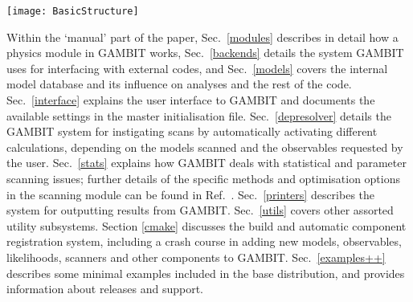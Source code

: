 \documentclass[pdftex,twocolumn,epjc3_preprint,runningheads]{svjour3}
\renewcommand{\_}{\discretionary{\underscore}{}{\underscore}}
\newcommand{\gambit}{\textsf{GAMBIT}\xspace}
\newcommand{\scannerbit}{\textsf{ScannerBit}\xspace}
\newcommand{\GB}{\gambit}
\newcommand\YAML{\textsf{YAML}\xspace}
\begin{document}
\begin{figure*}[t]
\centering
\texttt{[image: BasicStructure]}
\caption[A schematic representation of the basic elements of a \GB scan]{A schematic representation of the basic elements of a \GB scan.  The user provides a \YAML input file (see \href{http://www.yaml.org/}{www.yaml.org}), which chooses a model to scan and some observables or likelihoods to calculate.  The requested model $\delta$ and its ancestor models (see text for definition) $\beta$ and $\alpha$ are activated.  All model-dependent module and backend functions/variables are tested for compatibility with the activated models; incompatible functions are disabled (C2 in the example).  Module functions are identified that can provide the requested quantities (A2 and B1 in the example), and other module functions are identified to fulfil their dependencies.  More are identified to fulfil those functions' dependencies until all dependencies are filled.  Backend functions and variables are found that can fulfil the backend requirements of all chosen module functions.  The \textsf{Core} determines the correct module function evaluation order.  It passes the information on to \scannerbit, which chooses parameter combinations to sample, running the module functions in order for each parameter combination.  The requested quantities are output by the printer system for each parameter combination tested.}
\label{fig::design}
\end{figure*}

Within the `manual' part of the paper, Sec.\ \ref{modules} describes in detail how a physics module in \GB works, Sec.\ \ref{backends} details the system \GB uses for interfacing with external codes, and Sec.\ \ref{models} covers the internal model database and its influence on analyses and the rest of the code.  Sec.\ \ref{interface} explains the user interface to \GB and documents the available settings in the master initialisation file.  Sec.~\ref{depresolver} details the \GB system for instigating scans by automatically activating different calculations, depending on the models scanned and the observables requested by the user.  Sec.\ \ref{stats} explains how \GB deals with statistical and parameter scanning issues; further details of the specific methods and optimisation options in the scanning module can be found in Ref.\ \cite{ScannerBit}.  Sec.\ \ref{printers} describes the system for outputting results from \GB.  Sec.\ \ref{utils} covers other assorted utility subsystems.  Section \ref{cmake} discusses the build and automatic component registration system, including a crash course in adding new models, observables, likelihoods, scanners and other components to \GB.  Sec.\ \ref{examples++} describes some minimal examples included in the base distribution, and provides information about releases and support.
\end{document}
